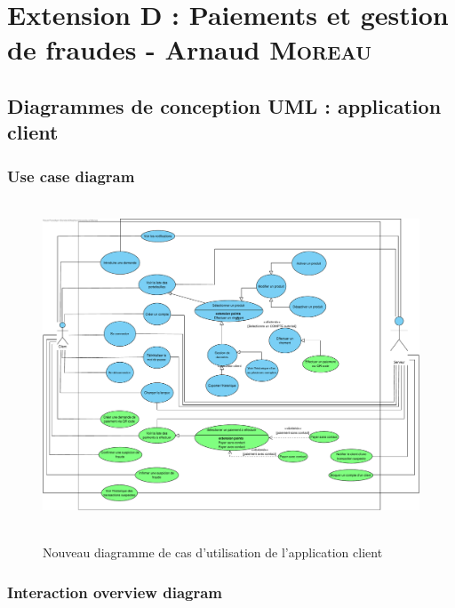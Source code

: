 \documentclass[]{report}
\begin{document}
\chapter{Extension D : Paiements et gestion de fraudes - Arnaud \textsc{Moreau}}





\newpage




\section{Diagrammes de conception UML : application client}




\subsection{Use case diagram}

\begin{figure}[h!]
\vspace{2cm}
\hspace{-1cm}
\hbox{
	\includegraphics[scale=0.45]{img/Use Case Client - Extension 6.pdf}
}
\caption{Nouveau diagramme de cas d'utilisation de l'application client}
\end{figure}



\newpage

\subsection{Interaction overview diagram}
\end{document}
